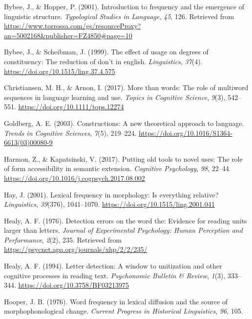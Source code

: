 \documentclass[
  man,floatsintext]{apa6}
\newlength{\cslhangindent}
\newlength{\cslentryspacingunit} %
\newenvironment{CSLReferences}[2] %
 {%
  \setlength{\parindent}{0pt}
  \ifodd #1
  \let\oldpar\par
  \def\par{\hangindent=\cslhangindent\oldpar}
  \fi
  \setlength{\parskip}{#2\cslentryspacingunit}
 }%
 {}
\begin{document}
\begin{CSLReferences}{1}{0}
\leavevmode{}%
Bybee, J., \& Hopper, P. (2001). Introduction to frequency and the emergence of linguistic structure. \emph{Typological Studies in Language}, \emph{45}, 126. Retrieved from \url{https://www.torrossa.com/gs/resourceProxy?an=5002168\&publisher=FZ4850\#page=10}

\leavevmode{}%
Bybee, J., \& Scheibman, J. (1999). The effect of usage on degrees of constituency: The reduction of don't in english. \emph{Linguistics}, \emph{37}(4). \url{https://doi.org/10.1515/ling.37.4.575}

\leavevmode{}%
Christiansen, M. H., \& Arnon, I. (2017). More than words: The role of multiword sequences in language learning and use. \emph{Topics in Cognitive Science}, \emph{9}(3), 542--551. \url{https://doi.org/10.1111/tops.12274}

\leavevmode{}%
Goldberg, A. E. (2003). Constructions: A new theoretical approach to language. \emph{Trends in Cognitive Sciences}, \emph{7}(5), 219--224. \url{https://doi.org/10.1016/S1364-6613(03)00080-9}

\leavevmode{}%
Harmon, Z., \& Kapatsinski, V. (2017). Putting old tools to novel uses: The role of form accessibility in semantic extension. \emph{Cognitive Psychology}, \emph{98}, 22--44. \url{https://doi.org/10.1016/j.cogpsych.2017.08.002}

\leavevmode{}%
Hay, J. (2001). Lexical frequency in morphology: Is everything relative? \emph{Linguistics}, \emph{39}(376), 1041--1070. \url{https://doi.org/10.1515/ling.2001.041}

\leavevmode{}%
Healy, A. F. (1976). Detection errors on the word the: Evidence for reading units larger than letters. \emph{Journal of Experimental Psychology: Human Perception and Performance}, \emph{2}(2), 235. Retrieved from \url{https://psycnet.apa.org/journals/xhp/2/2/235/}

\leavevmode{}%
Healy, A. F. (1994). Letter detection: A window to unitization and other cognitive processes in reading text. \emph{Psychonomic Bulletin \& Review}, \emph{1}(3), 333--344. \url{https://doi.org/10.3758/BF03213975}

\leavevmode{}%
Hooper, J. B. (1976). Word frequency in lexical diffusion and the source of morphophonological change. \emph{Current Progress in Historical Linguistics}, \emph{96}, 105.


\end{CSLReferences}
\end{document}
